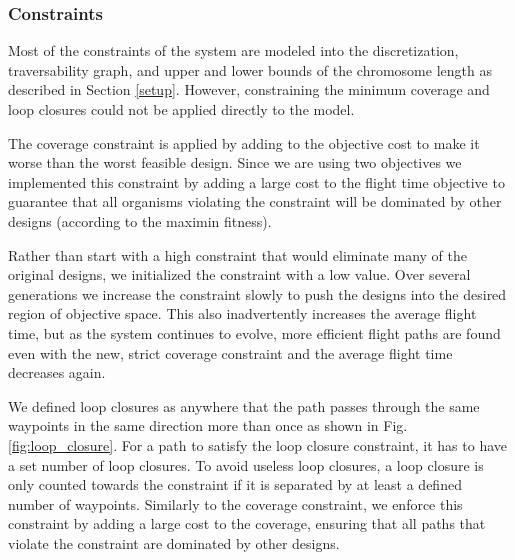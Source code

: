 \documentclass[letterpaper, 10 pt, conference]{ieeeconf}  %
\begin{document}
\subsubsection{Constraints}\label{constraints}

Most of the constraints of the system are modeled into the discretization, traversability graph, and upper and lower bounds of the chromosome length as described in Section \ref{setup}. However, constraining the minimum coverage and loop closures could not be applied directly to the model.

The coverage constraint is applied by adding to the objective cost to make it worse than the worst feasible design. Since we are using two objectives we implemented this constraint by adding a large cost to the flight time objective to guarantee that all organisms violating the constraint will be dominated by other designs (according to the maximin fitness).

Rather than start with a high constraint that would eliminate many of the original designs, we initialized the constraint with a low value. Over several generations we increase the constraint slowly to push the designs into the desired region of objective space. This also inadvertently increases the average flight time, but as the system continues to evolve, more efficient flight paths are found even with the new, strict coverage constraint and the average flight time decreases again.

We defined loop closures as anywhere that the path passes through the same waypoints in the same direction more than once as shown in Fig. \ref{fig:loop_closure}. For a path to satisfy the loop closure constraint, it has to have a set number of loop closures. To avoid useless loop closures, a loop closure is only counted towards the constraint if it is separated by at least a defined number of waypoints. Similarly to the coverage constraint, we enforce this constraint by adding a large cost to the coverage, ensuring that all paths that violate the constraint are dominated by other designs.
\end{document}
